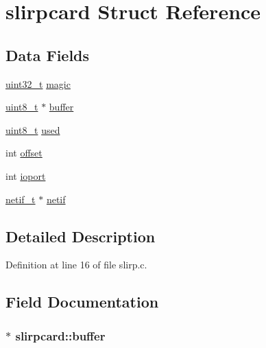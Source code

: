 \hypertarget{structslirpcard}{\section{slirpcard Struct Reference}
\label{structslirpcard}
}
\subsection*{Data Fields}
\begin{DoxyCompactItemize}
\item 
\hyperlink{aplus_8h_a53a0df51603c77c2aa5b9ea61b606a82}{uint32\+\_\+t} \hyperlink{structslirpcard_ab77a4a7b33ab2cd4a821aff9445cd134}{magic}
\item 
\hyperlink{aplus_8h_ae0430369c5a35dcdbc0bc19dcbb33a03}{uint8\+\_\+t} $\ast$ \hyperlink{structslirpcard_a3a9cd572ee740f4844706613f6c1a98d}{buffer}
\item 
\hyperlink{aplus_8h_ae0430369c5a35dcdbc0bc19dcbb33a03}{uint8\+\_\+t} \hyperlink{structslirpcard_aca0b3836ef213a9ab9cab689175d6a38}{used}
\item 
int \hyperlink{structslirpcard_adda6ed53672da7a5e56fd16007d704d0}{offset}
\item 
int \hyperlink{structslirpcard_aed1b09924afb61043cd93bed7edea389}{ioport}
\item 
\hyperlink{netif_8h_af6c73b8fa12396c0382f58d63e895008}{netif\+\_\+t} $\ast$ \hyperlink{structslirpcard_a4c84f5911831326cc979fe1c96c8607b}{netif}
\end{DoxyCompactItemize}


\subsection{Detailed Description}


Definition at line 16 of file slirp.\+c.



\subsection{Field Documentation}
\hypertarget{structslirpcard_a3a9cd572ee740f4844706613f6c1a98d}{
\subsubsection[{buffer}]{$\ast$ slirpcard\+::buffer}}\label{structslirpcard_a3a9cd572ee740f4844706613f6c1a98d}


